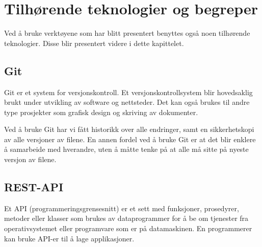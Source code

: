\section{Tilhørende teknologier og begreper}
Ved å bruke verktøyene som har blitt presentert benyttes også noen tilhørende teknologier. Disse blir presentert videre i dette kapittelet. 

\subsection{Git}
Git \cite{TechTarget} er et system for versjonskontroll. Et versjonskontrollsystem blir hovedsaklig brukt under utvikling av software og nettsteder. Det kan også brukes til andre type prosjekter som grafisk design og skriving av dokumenter.

Ved å bruke Git har vi fått historikk over alle endringer, samt en sikkerhetskopi av alle versjoner av filene. En annen fordel ved å bruke Git er at det blir enklere å samarbeide med hverandre, uten å måtte tenke på at alle må sitte på nyeste versjon av filene.




\subsection{REST-API}
Et API (programmeringsgrensesnitt) er et sett med funksjoner, prosedyrer, metoder eller klasser som brukes av dataprogrammer for å be om tjenester fra operativsystemet eller programvare som er på datamaskinen. En programmerer kan bruke API-er til å lage applikasjoner.

